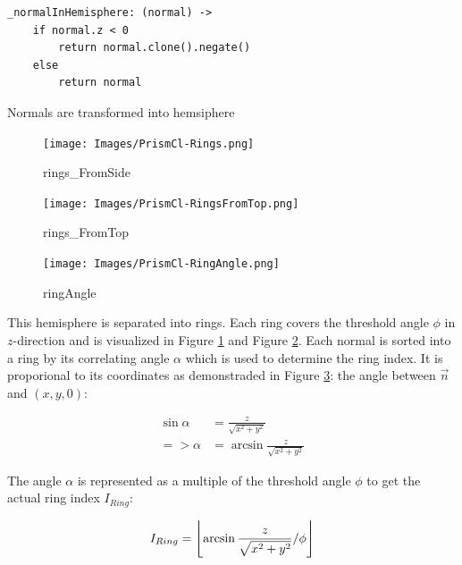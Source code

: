 \documentclass[../ClassicThesis.tex]{subfiles}
\begin{document}
\begin{listing}[!h]
\centering
\begin{verbatim}
_normalInHemisphere: (normal) ->
    if normal.z < 0
        return normal.clone().negate()
    else
        return normal
\end{verbatim}
\caption{Normals are transformed into hemsiphere}
\label{lst:_normalInHemisphere}
\end{listing}

\begin{figure}
    \texttt{[image: Images/PrismCl-Rings.png]}
    \caption{rings_FromSide}
    \label{fig:rings_FromSide}
\end{figure}

\begin{figure}
    \texttt{[image: Images/PrismCl-RingsFromTop.png]}
    \caption{rings_FromTop}
    \label{fig:rings_FromTop}
\end{figure}

\begin{figure}
    \texttt{[image: Images/PrismCl-RingAngle.png]}
    \caption{ringAngle}
    \label{fig:ringAngle}
\end{figure}


This hemisphere is separated into rings. Each ring covers the threshold angle $\phi$ in $z$-direction and is visualized in Figure \ref{fig:rings_FromSide} and Figure \ref{fig:rings_FromTop}. Each normal is sorted into a ring by its correlating angle $\alpha$ which is used to determine the ring index. It is proporional to its coordinates as demonstraded in Figure \ref{fig:ringAngle}: the angle between $\vec{n}$ and $(x,y,0)$:

\begin{equation*}
\begin{split}
    \sin{\alpha} & = \frac{z}{ \sqrt{x^{2} + y^{2}} } \\
    => \alpha  & = \arcsin{ \frac{z}{ \sqrt{x^{2} + y^{2}} } }
\end{split}
\end{equation*}


The angle $\alpha$ is represented as a multiple of the threshold angle $\phi$ to get the actual ring index $I_{Ring}$:

\begin{equation*}
    I_{Ring} = \floor*{ 
                    \arcsin{ 
                        \frac{z}{ \sqrt{ x^{2} + y^{2} } } 
                    } 
                    / \phi 
                }
\end{equation*}
\end{document}
